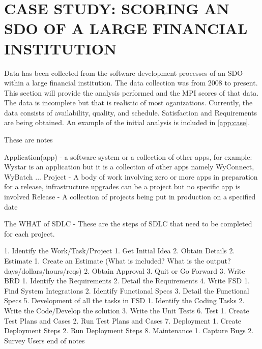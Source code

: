 \documentclass[SDSUThesis.tex]{subfiles}
\begin{document}
\section{CASE STUDY: SCORING AN SDO OF A LARGE FINANCIAL INSTITUTION}

Data has been collected from the software development processes of
an SDO within a large financial institution.
The data collection was from 2008 to present. This section will provide the analysis performed and the MPI scores of that data. The data is incomplete but that is realistic of most oganizations.  Currently, the data
consists of availability, quality, and schedule.  Satisfaction and Requirements are being obtained. An example of the initial analysis is included in \cref{app:case}.

These are notes

Application(app) - a software system or a collection of other apps, for example: Wystar is an application but it is a collection of other apps namely WyConnect, WyBatch ...
Project - A body of work involving zero or more apps in preparation for a release, infrastructure upgrades can be a project but no specific app is involved
Release - A collection of projects being put in production on a specified date


The WHAT of SDLC - These are the steps of SDLC that need to be completed for each project.

1. Identify the Work/Task/Project
  1. Get Initial Idea
  2. Obtain Details
2. Estimate
  1. Create an Estimate (What is included? What is the output? days/dollars/hours/reqs)
  2. Obtain Approval 
  3. Quit or Go Forward
3. Write BRD
  1. Identify the Requirements
  2. Detail the Requirements
4. Write FSD
  1. Find System Integrations
  2. Identify Functional Specs
  3. Detail the Functional Specs
5. Development of all the tasks in FSD
  1. Identify the Coding Tasks
  2. Write the Code/Develop the solution
  3. Write the Unit Tests
6. Test
  1. Create Test Plans and Cases
  2. Run Test Plans and Cases
7. Deployment
  1. Create Deployment Steps
  2. Run Deployment Steps
8. Maintenance
  1. Capture Bugs
  2. Survey Users
 end of notes
\end{document}
